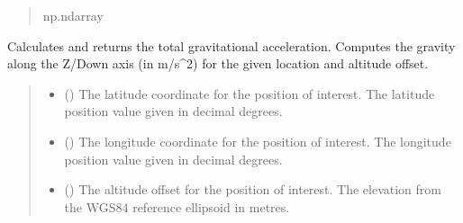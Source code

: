 \documentclass[letterpaper,10pt,english]{sphinxmanual}
\begin{document}
\begin{fulllineitems}
\begin{fulllineitems}
\begin{quote}
\begin{description}
\sphinxAtStartPar
np.ndarray

\end{description}\end{quote}

\end{fulllineitems}


\begin{fulllineitems}
\label{\detokenize{modules/gravity/ggm_plus:qnav.gravity.ggm_plus.GGMPlusDist.calc_gravity_z}}
\pysigstartsignatures
{}
\pysigstopsignatures
\sphinxAtStartPar
Calculates and returns the total gravitational acceleration.
Computes the gravity along the Z/Down axis (in m/s\textasciicircum{}2) for
the given location and altitude offset.
\begin{quote}\begin{description}
\begin{itemize}
\item {} 
\sphinxAtStartPar
{} () \textendash{} The latitude coordinate for the position of interest.
The latitude position value given in decimal degrees.

\item {} 
\sphinxAtStartPar
{} () \textendash{} The longitude coordinate for the position of interest.
The longitude position value given in decimal degrees.

\item {} 
\sphinxAtStartPar
{} () \textendash{} The altitude offset for the position of interest.
The elevation from the WGS\sphinxhyphen{}84 reference ellipsoid in metres.

\end{itemize}


\end{description}
\end{quote}
\end{fulllineitems}
\end{fulllineitems}
\end{document}
